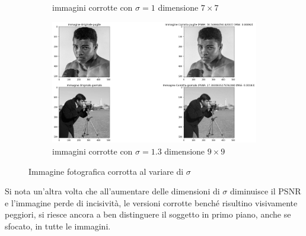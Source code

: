 \begin{figure}[H]
\begin{subfigure}{0.67\textwidth}
        \caption{immagini corrotte con $\sigma = 1$ dimensione $7 \times 7$}
        \label{fig:fotogrCorrotte7x7}
    \end{subfigure}
    \begin{subfigure}{0.67\textwidth}
        \centering
        \includegraphics[width=\textwidth]{confrontiPuntoUno/9-1.3-0.02.png}
        \caption{immagini corrotte con $\sigma = 1.3$ dimensione $9 \times 9$}
        \label{fig:fotogrCorrotte9x9}
    \end{subfigure}
    \caption{Immagine fotografica corrotta al variare di $\sigma$}
    \label{fig:fotogrCorrotte}
\end{figure}

Si nota un'altra volta che all'aumentare delle dimensioni di $\sigma$ diminuisce il PSNR e l'immagine perde di 
incisività, le versioni corrotte benché risultino visivamente peggiori, si riesce ancora a ben distinguere il 
soggetto in primo piano, anche se sfocato, in tutte le immagini. 
